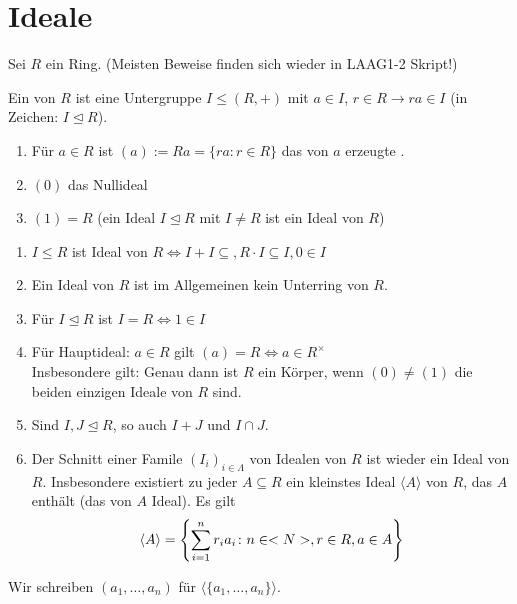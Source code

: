 \section{Ideale}

Sei $R$ ein Ring. (Meisten Beweise finden sich wieder in LAAG1-2 Skript!)

\begin{definition}
	Ein  von $R$ ist eine Untergruppe $I \leq (R,+)$ mit $a \in I$, $r \in R \to ra \in I$ (in Zeichen: $I \unlhd R$).
\end{definition}

\begin{example}
	\begin{enumerate}
		\item Für $a \in R$ ist $(a) := Ra = \{ra \colon r \in R\}$ das von $a$ erzeugte .
		\item $(0)$ das Nullideal
		\item $(1) = R$  (ein Ideal $I \unlhd R$ mit $I \neq R$ ist ein  Ideal  von $R$) 
	\end{enumerate}
\end{example}

\begin{remark}
	\begin{enumerate}
		\item $I \leq R$ ist Ideal von $R \Leftrightarrow I + I \subseteq, R \cdot I \subseteq I, 0 \in I$
		\item Ein Ideal von $R$ ist im Allgemeinen kein Unterring von $R$.
		\item Für $I \unlhd R$ ist $I = R \Leftrightarrow 1 \in I$
		\item Für Hauptideal: $a \in R$ gilt $(a) = R \Leftrightarrow a \in R^{\times}$\\
		Insbesondere gilt: Genau dann ist $R$ ein Körper, wenn $(0) \neq (1)$ die beiden einzigen Ideale von $R$ sind.
		\item Sind $I,J \unlhd R$, so auch $I + J$ und $I \cap J$.
		\item Der Schnitt einer Famile $(I_i)_{i \in \Lambda}$ von Idealen von $R$ ist wieder ein Ideal von $R$. Insbesondere existiert zu jeder $A \subseteq R$ ein kleinstes Ideal $\langle A \rangle$ von $R$, das $A$ enthält (das von $A$  Ideal). Es gilt
		\begin{align}
			\langle A \rangle = \left\{ \sum_{i=1}^{n} r_i a_i \colon n \in <N>, r \in R, a \in A\right\} \notag
		\end{align}
	\end{enumerate}
	Wir schreiben $(a_1, \dots, a_n)$ für $\langle\{ a_1, \dots, a_n \}\rangle$.
\end{remark}

